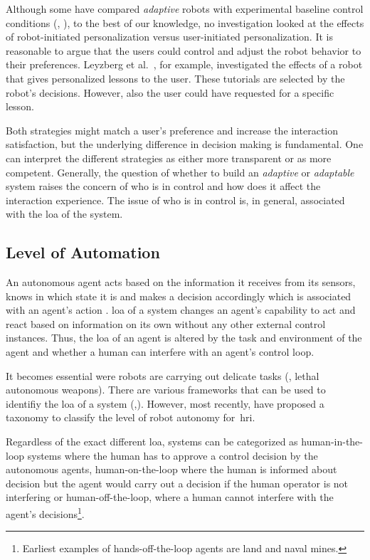 \documentclass[twocolumn]{svjour3}          %
\begin{document}
Although some have compared \textit{adaptive} robots with experimental baseline
control conditions (\eg{}, \autocite{leite2011modelling,leyzberg2014personalizing}), to the
best of our knowledge, no investigation looked at the effects of robot-initiated
personalization versus user-initiated personalization. It is reasonable
to argue that the users could control and adjust the robot behavior to
their preferences. Leyzberg et al.~\autocite{leyzberg2014personalizing},
for example, investigated the effects of a robot that gives personalized
lessons to the user. These tutorials are selected by the robot's
decisions. However, also the user could have requested for a specific
lesson.

Both strategies might match a user's preference and increase the
interaction satisfaction, but the underlying difference in decision
making is fundamental. One can interpret the different strategies as
either more transparent or as more competent. Generally, the question of
whether to build an \textit{adaptive} or \textit{adaptable} system raises the concern of
who is in control and how does it affect the interaction experience. The
issue of who is in control is, in general, associated with the \gls{loa} of the system.

\hypertarget{level-of-automation}{%
\subsection{Level of Automation}\label{level-of-automation}}

An autonomous agent acts based on the information it receives from its
sensors, knows in which state it is and makes a decision accordingly
which is associated with an agent's action
\autocite[see][ch.~1]{russell2016artificial}. \gls{loa} of a system changes an
agent's capability to act and react based on information on its own
without any other external control instances. Thus, the \gls{loa} of an agent
is altered by the task and environment of the agent and whether a human
can interfere with an agent's control loop.

It becomes essential were robots are carrying out delicate tasks (\eg{},
lethal autonomous weapons). There are various frameworks that can be
used to identifiy the \gls{loa} of a system
(\eg{},\autocite{sheridan1978human,endsley1995out}). However, most
recently, \textcite{beer2014toward} have proposed a taxonomy to classify
the level of robot autonomy for~\gls{hri}.

Regardless of the exact different \gls{loa}, systems can be categorized as
human-in-the-loop systems where the human has to approve a control
decision by the autonomous agents, human-on-the-loop where the human is
informed about decision but the agent would carry out a decision if the
human operator is not interfering or human-off-the-loop, where a human
cannot interfere with the agent's
decisions\footnote{Earliest examples of hands-off-the-loop agents are land and naval mines.}.
\end{document}

